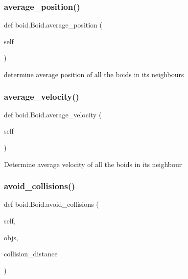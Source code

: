 \subsubsection{\texorpdfstring{average\+\_\+position()}{average\_position()}}
{\footnotesize\ttfamily def boid.\+Boid.\+average\+\_\+position (\begin{DoxyParamCaption}\item[{}]{self }\end{DoxyParamCaption})}

\begin{DoxyVerb}determine average position of all the boids in its neighbours\end{DoxyVerb}
 \mbox{\label{classboid_1_1Boid_af3bebad17918fa7e106e50cc6f300209}} 
\subsubsection{\texorpdfstring{average\+\_\+velocity()}{average\_velocity()}}
{\footnotesize\ttfamily def boid.\+Boid.\+average\+\_\+velocity (\begin{DoxyParamCaption}\item[{}]{self }\end{DoxyParamCaption})}

\begin{DoxyVerb}Determine average velocity of all the boids in its neighbour\end{DoxyVerb}
 \mbox{\label{classboid_1_1Boid_a5abaa756b7a6faf040d06f5c9a2f5dff}} 
\subsubsection{\texorpdfstring{avoid\+\_\+collisions()}{avoid\_collisions()}}
{\footnotesize\ttfamily def boid.\+Boid.\+avoid\+\_\+collisions (\begin{DoxyParamCaption}\item[{}]{self,  }\item[{}]{objs,  }\item[{}]{collision\+\_\+distance }\end{DoxyParamCaption})}

